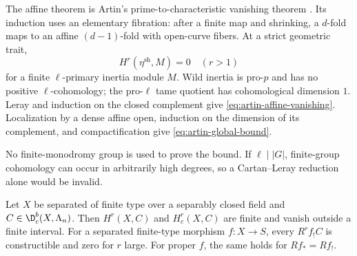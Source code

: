 \begin{foundation}[title={Foundational proof capsule: the dimension bound}]
The affine theorem is Artin's prime-to-characteristic vanishing theorem
\cite{SGA4,SGA4half}.  Its induction uses an elementary fibration: after a
finite map and shrinking, a \(d\)-fold maps to an affine
\((d-1)\)-fold with open-curve fibers.  At a strict geometric trait,
\[
 H^r(\eta^{\mathrm{sh}},M)=0\quad(r>1)
\]
for a finite \(\ell\)-primary inertia module \(M\).  Wild inertia is pro-\(p\)
and has no positive \(\ell\)-cohomology; the pro-\(\ell\) tame quotient has
cohomological dimension \(1\).  Leray and induction on the closed complement
give \eqref{eq:artin-affine-vanishing}.  Localization by a dense affine open,
induction on the dimension of its complement, and compactification give
\eqref{eq:artin-global-bound}.

No finite-monodromy group is used to prove the bound.  If
\(\ell\mid|G|\), finite-group cohomology can occur in arbitrarily high
degrees, so a Cartan--Leray reduction alone would be invalid.
\end{foundation}

\begin{theorem}
\label{thm:torsion-finiteness}
Let \(X\) be separated of finite type over a separably closed field and
\(C\in\D^b_c(X,\Lambda_n)\).  Then \(H^r(X,C)\) and \(H^r_c(X,C)\) are finite
and vanish outside a finite interval.  For a separated finite-type morphism
\(f:X\to S\), every \(R^rf_!C\) is constructible and zero for \(r\) large.
For proper \(f\), the same holds for \(Rf_*=Rf_!\).
\end{theorem}

